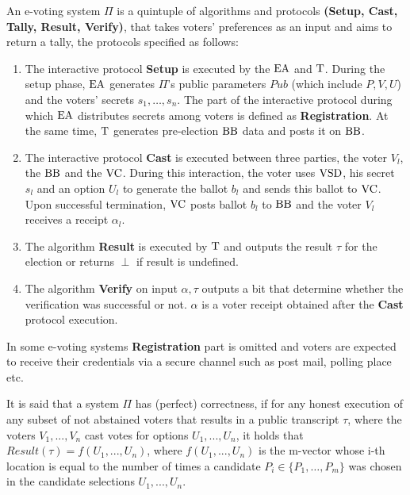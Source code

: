 An e-voting system $\Pi$ is a quintuple of algorithms and protocols  \textbf{(Setup, Cast, Tally, Result, Verify)}, that takes  voters' preferences as an input and aims to return a tally, the protocols specified as follows:
\begin{enumerate}
\item The interactive protocol \textbf{Setup} is executed by the $\operatorname{EA}$ and $\operatorname{T}$. During the setup phase, $\operatorname{EA}$ generates $\Pi$'s public parameters $Pub$ (which include $P, V, U$) and the voters' secrets $s_1, \dots , s_n$. The part of the interactive protocol during which $\operatorname{EA}$ distributes secrets among voters is defined as \textbf{Registration}. At the same time, $\operatorname{T}$ generates pre-election $\operatorname{BB}$ data and posts it on $\operatorname{BB}$.
\item The interactive protocol \textbf{Cast} is executed between three parties, the voter $V_l$, the $\operatorname{BB}$ and the $\operatorname{VC}$. During this interaction, the voter uses $\operatorname{VSD}$, his secret $s_l$ and an option $U_l$ to generate the ballot $b_l$ and sends this ballot to $\operatorname{VC}$. Upon successful termination, $\operatorname{VC}$ posts ballot $b_l$ to $\operatorname{BB}$ and the voter $V_l$ receives a receipt $\alpha_l$.
\item The algorithm \textbf{Result} is executed by $\operatorname{T}$ and outputs the result $\tau$ for the election or returns $\perp$ if result is undefined.
\item  The algorithm \textbf{Verify} on input $\alpha,\tau$ outputs a bit that determine whether the verification was successful or not.  $\alpha$ is a voter receipt obtained after the \textbf{Cast} protocol execution.
\end{enumerate}
In some e-voting systems \textbf{Registration} part is omitted and voters are expected to receive their credentials via a secure channel such as post mail, polling place etc.
\begin{definition}
It is said that a system $\Pi$ has (perfect) correctness, if for any honest execution of any subset of not abstained voters that results in a public transcript $\tau$, where the voters $V_1, . . . , V_n$ cast votes for options $U_1, . . . , U_n$, it holds that $Result(\tau) = f(U_1,...,U_n)$, where $f(U_1,...,U_n)$ is the m-vector whose i-th location is equal to the number of times a candidate $P_i \in \{P_1,\dots, P_m\}$ was chosen in the candidate selections $U_1, . . . , U_n$.
\end{definition}
